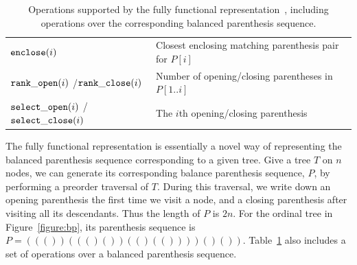 \begin{table}[t]
\begin{center}
\begin{tabular} {|p{2.4cm}|p{5.2cm}|}
$\mathtt{enclose}(i)$                           &Closest enclosing matching parenthesis pair for $P[i]$ \\
$\mathtt{rank\_open}(i)$ /$\mathtt{rank\_close}(i)$       &Number of opening/closing parentheses in $P[1..i]$\\
$\mathtt{select\_open}(i)$ /$\mathtt{select\_close}(i)$   &The $i$th opening/closing parenthesis\\ \hline
\end{tabular}
\caption{Operations supported by the fully functional representation~\cite{Navarro:2014:FFS:2620785.2601073}, including operations over the corresponding balanced parenthesis sequence.}
\label{tbl:operations}
\end{center}
\end{table}

The fully functional representation is essentially a novel way of representing the balanced parenthesis sequence corresponding to a given tree. 
Give a tree $T$ on $n$ nodes, we can generate its corresponding balance parenthesis sequence, $P$, by performing a preorder traversal of $T$. 
During this traversal, we write down an opening parenthesis the first time we visit a node, and a closing parenthesis after visiting all its descendants. 
Thus the length of $P$ is $2n$. 
For the ordinal tree in Figure~\ref{figure:bp}, its parenthesis sequence is $P = ((())((()())(()(())))()())$. 
Table~\ref{tbl:operations} also includes a set of operations over a balanced parenthesis sequence.%

